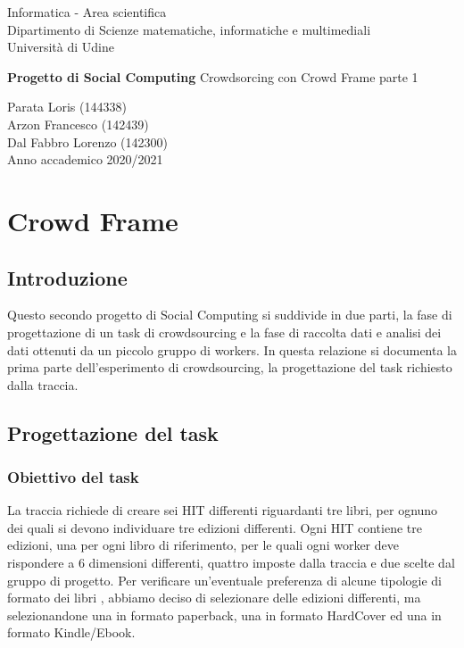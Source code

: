\documentclass[a4paper,11pt]{report}
\begin{document}
\begin{titlepage}
  \clearpage\thispagestyle{empty}
  \centering
  \vspace{1cm}
  {\normalsize Informatica - Area scientifica \\  Dipartimento di Scienze matematiche, informatiche e multimediali\\  Università di Udine \par}
  \vspace{3cm}
  {\Huge \textbf{Progetto di Social Computing \newline
  } \LARGE{Crowdsorcing con Crowd Frame  parte 1}
  }

  \vspace{4cm}
  {\Large  Parata Loris (144338) \\ Arzon Francesco (142439)\\ Dal Fabbro Lorenzo (142300)\\ }
  \vspace{12cm}
  {\normalsize Anno accademico 2020/2021}
  \pagebreak
\end{titlepage}

\tableofcontents{}
\pagebreak
\chapter{Crowd Frame}
\section{Introduzione}
Questo secondo progetto di Social Computing si suddivide in due parti, la fase di progettazione di un task di crowdsourcing e la fase di raccolta dati e analisi dei dati ottenuti da un piccolo gruppo di workers.
In questa relazione si documenta  la prima parte dell'esperimento di crowdsourcing, la progettazione del task richiesto dalla traccia.


\section{Progettazione del task}

\subsection{Obiettivo del task}
La traccia richiede di creare sei HIT differenti riguardanti tre libri, per ognuno dei quali si devono individuare tre edizioni differenti. Ogni HIT contiene tre edizioni, una per ogni libro di riferimento, per le quali ogni worker deve rispondere a 6 dimensioni differenti, quattro imposte dalla traccia e due scelte dal gruppo di progetto.
Per verificare un'eventuale preferenza di alcune tipologie di formato dei libri , abbiamo deciso di selezionare delle edizioni differenti, ma selezionandone una in formato paperback, una in formato HardCover ed una in formato Kindle/Ebook.
\end{document}
